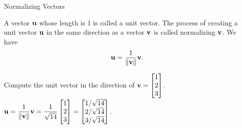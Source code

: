 \documentclass[xcolor=dvipsnames,aspectratio=169,t]{beamer}
\begin{document}
\begin{frame}{Normalizing Vectors}
  \begin{definition}
    A vector $\mathbf{u}$ whose length is $1$ is called a \alert{unit vector}.
    The process of creating a unit vector $\mathbf{u}$ in the same direction as a vector $\mathbf{v}$ is called \alert{normalizing} $\mathbf{v}$.
    We have \[ \mathbf{u} = \frac{1}{\| \mathbf{v} \|} \mathbf{v} .\]
  \end{definition}
  \bigskip

  \pause
  \medskip

  Compute the unit vector in the direction of $\mathbf{v} = \begin{bmatrix} 1\\ 2\\ 3\end{bmatrix}$.
  \pause
  $ \mathbf{u} = \displaystyle\frac{1}{\| \mathbf{v} \|} \mathbf{v} 
  = \displaystyle\frac{1}{\sqrt{14}}\begin{bmatrix} 1\\ 2\\ 3\end{bmatrix}
  =\begin{bmatrix} 1/\sqrt{14} \\ 2/\sqrt{14} \\ 3/\sqrt{14} \end{bmatrix}$.
\end{frame}
\end{document}
